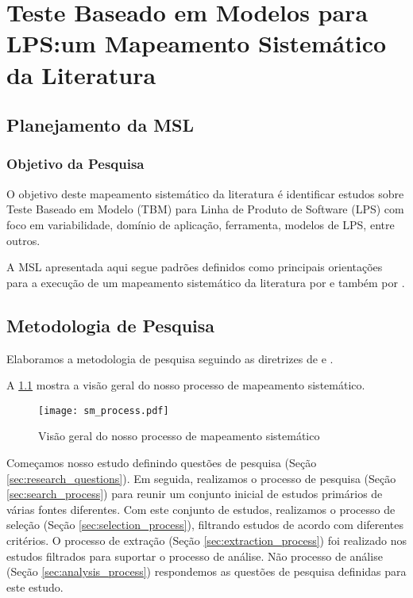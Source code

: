 \chapter{Teste Baseado em Modelos para LPS:um Mapeamento Sistemático da Literatura}
\label{sec:MSL}
\pagestyle{plain}

\section{Planejamento da MSL}
\subsection{Objetivo da Pesquisa}
O objetivo deste mapeamento sistemático da literatura é identificar estudos sobre Teste Baseado em Modelo (TBM) para Linha de Produto de Software (LPS) com foco em variabilidade, domínio de aplicação, ferramenta, modelos de LPS, entre outros.

A MSL apresentada aqui segue padrões definidos como principais orientações para a execução de um mapeamento sistemático da literatura por \cite{kitchenham2004procedures} e também por \cite{keele2007guidelines}.

\section{Metodologia de Pesquisa}
\label{sec:metodologia}

Elaboramos a metodologia de pesquisa seguindo as diretrizes de \citealp{petersen2015guidelines} e \citealp{kitchenham2015evidence}.

A \ref{fig:mapping_process} mostra a visão geral do nosso processo de mapeamento sistemático.

\begin{figure} [! ht]
	\centering
	\texttt{[image: sm\_process.pdf]}
	\caption{Visão geral do nosso processo de mapeamento sistemático}
	\label{fig:mapping_process}
\end{figure}

Começamos nosso estudo definindo questões de pesquisa (Seção \ref{sec:research_questions}). Em seguida, realizamos o processo de pesquisa (Seção \ref{sec:search_process}) para reunir um conjunto inicial de estudos primários de várias fontes diferentes. Com este conjunto de estudos, realizamos o processo de seleção (Seção \ref{sec:selection_process}), filtrando estudos de acordo com diferentes critérios. O processo de extração (Seção \ref{sec:extraction_process}) foi realizado nos estudos filtrados para suportar o processo de análise. Não processo de análise (Seção \ref{sec:analysis_process}) respondemos as questões de pesquisa definidas para este estudo.


